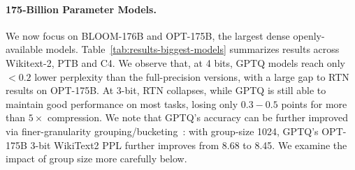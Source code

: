 \vspace{-1em}

\begin{table}[h]
    \centering
    \vspace{5pt}
    \caption{BLOOM model family perplexity results for Penn Treebank.}
    \label{tab:bloom-ptb}
\end{table}
\vspace{-10pt}

\paragraph{175-Billion Parameter Models.} We now focus on BLOOM-176B and OPT-175B, the largest dense openly-available models. 
Table~\ref{tab:results-biggest-models} summarizes results across Wikitext-2, PTB and C4. 
We observe that, at 4 bits, GPTQ models reach only $< 0.2$ lower perplexity than the full-precision versions, with a large gap to RTN results on OPT-175B. 
At 3-bit, RTN collapses, while GPTQ is still able to maintain good performance on most tasks, losing only $0.3 - 0.5$ points for more than $5\times$ compression. 
We note that GPTQ's accuracy can be further improved via finer-granularity grouping/bucketing~\cite{alistarh2016qsgd, park2022nuqmm}: with group-size 1024, GPTQ's OPT-175B 3-bit WikiText2 PPL further improves from 8.68 to 8.45. We examine the impact of group size more carefully below. 


